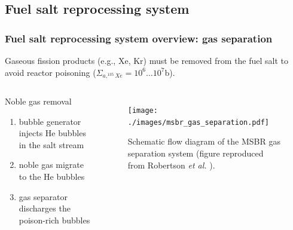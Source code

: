 \subsection{Fuel salt reprocessing system}

\begin{frame}
  \frametitle{Fuel salt reprocessing system overview: gas separation}
  Gaseous fission products (e.g., Xe, Kr) must be removed from the fuel salt 
  to avoid reactor poisoning ($\Sigma_{a,^{135}Xe}=10^6\dots10^7$b). 
  
      \begin{columns}
      	\column[t]{4.0cm}
    \begin{block}{Noble gas removal}
      \begin{enumerate}
      	\item[\textcolor{blue}{\textbullet}] bubble generator injects He 
      	bubbles in the salt stream
      	\item[\textcolor{green}{\textbullet}] noble gas migrate to the He 
      	bubbles 
      	\item[\textcolor{red}{\textbullet}] gas separator discharges the 
      	poison-rich bubbles
      \end{enumerate}
    \end{block}    	
      	
     	\column[t]{8cm}
  \begin{figure}[t]
	  \centering
	  		\vspace{-1mm}
		\texttt{[image: ./images/msbr\_gas\_separation.pdf]}
	\caption{Schematic flow diagram of the \gls{MSBR} gas separation system 
	(figure reproduced from Robertson \emph{et al.}  
	\cite{robertson_conceptual_1971}).} 
    \end{figure}

	\end{columns}
\end{frame}

